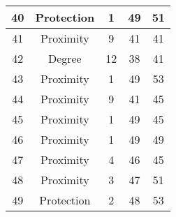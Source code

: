 \documentclass[results.tex]{subfiles}
\begin{document}
\begin{center}
\begin{tabular}{| c || c | c | c | c |}
            \hline
            40                      & Protection                   & 1                      & 49                      & 51                   \\
            \hline
            41                      & Proximity                    & 9                      & 41                      & 41                   \\
            \hline
            42                      & Degree                       & 12                     & 38                      & 41                   \\
            \hline
            43                      & Proximity                    & 1                      & 49                      & 53                   \\
            \hline
            44                      & Proximity                    & 9                      & 41                      & 45                   \\
            \hline
            45                      & Proximity                    & 1                      & 49                      & 45                   \\
            \hline
            46                      & Proximity                    & 1                      & 49                      & 49                   \\
            \hline
            47                      & Proximity                    & 4                      & 46                      & 45                   \\
            \hline
            48                      & Proximity                    & 3                      & 47                      & 51                   \\
            \hline
            49                      & Protection                   & 2                      & 48                      & 53                   \\
            \hline
        \end{tabular}
    \end{center}
\end{document}
